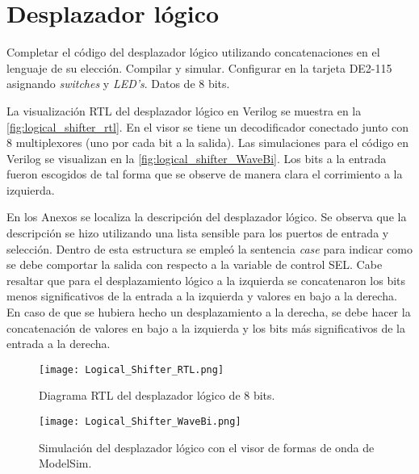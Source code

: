 \section{Desplazador lógico \label{sec:s1}}

\begin{center}
	\begin{minipage}{12cm}
		\begin{tcolorbox}[title=Actividad 1]
			Completar el código del desplazador lógico utilizando concatenaciones en el lenguaje de su elección. Compilar y simular. Configurar en la tarjeta DE2-115 asignando \textit{switches} y \textit{LED's}. Datos de 8 bits.
		\end{tcolorbox}	
	\end{minipage}
\end{center}

La visualización RTL del desplazador lógico en Verilog se muestra en la \autoref{fig:logical_shifter_rtl}. En el visor se tiene un decodificador conectado junto con 8 multiplexores (uno por cada bit a la salida). Las simulaciones para el código en Verilog se visualizan en la \autoref{fig:logical_shifter_WaveBi}. Los bits a la entrada fueron escogidos de tal forma que se observe de manera clara el corrimiento a la izquierda.

En los Anexos se localiza la descripción del desplazador lógico. Se observa que la descripción se hizo utilizando una lista sensible para los puertos de entrada y selección. Dentro de esta estructura se empleó la sentencia \textit{case} para indicar como se debe comportar la salida con respecto a la variable de control SEL. Cabe resaltar que para el desplazamiento lógico a la izquierda se concatenaron los bits menos significativos de la entrada a la izquierda y valores en bajo a la derecha. En caso de que se hubiera hecho un desplazamiento a la derecha, se debe hacer la concatenación de valores en bajo a la izquierda y los bits más significativos de la entrada a la derecha.

\begin{figure}[ht]
	\centering
	\texttt{[image: Logical\_Shifter\_RTL.png]}
	\caption{Diagrama RTL del desplazador lógico de 8 bits. \label{fig:logical_shifter_rtl}}
\end{figure}

\begin{figure}[ht]
	\centering
	\texttt{[image: Logical\_Shifter\_WaveBi.png]}
	\caption{Simulación del desplazador lógico con el visor de formas de onda de ModelSim. \label{fig:logical_shifter_WaveBi}}
\end{figure}